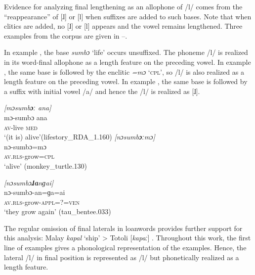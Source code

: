 Evidence for analyzing final lengthening as an allophone of /l/ comes from the ``reappearance'' of [ɺ] or [l] when suffixes are added to such bases. Note that when clitics are added, no [ɺ] or [l] appears and the vowel remains lengthened. Three examples from the corpus are given in --.\largerpage

In  example , the base \textit{sumbɔ{\ü}} `life' occurs unsuffixed. The phoneme /l/ is realized in its word-final allophone as a length feature on the preceding vowel. 
In  example , the same base is followed by the enclitic \textit{=mɔ} `\textsc{cpl}', so /l/ is also realized as a length feature on the preceding vowel.
In example  , the same base is followed by a suffix with initial vowel /a/ and hence the /l/ is realized as [ɺ]. 



\ea
\label{ex:mosumbo' ana}
\textit{[mɔsumb\textbf{ɔː} ana]}\\
\gll mɔ-sumbɔ{\ü} ana \\
\textsc{av-}live   \textsc{med} \\
\glt `(it is) alive'\hfill(lifestory\_RDA\_1.160)
\ex
\label{ex:nosumboomo}
\textit{[nɔsumb\textbf{ɔː}mɔ]}\\
\gll nɔ-sumbɔ{\ü}=mɔ \\
\textsc{av.rls-}grow\textsc{=cpl} \\
\glt `alive' \hfill (monkey\_turtle.130)

\newpage

\ex
\label{ex:mosumbolangai}
\textit{[nɔsumbɔ\textbf{ɺa}nɡai]}\\
\gll nɔ-sumbɔ{\ü}-an=ɡa=ai \\
\textsc{av.rls-}grow\textsc{-appl}\textsc{=?}\textsc{=ven} \\
\glt `they grow again' \hfill (tau\_bentee.033)
\z


The regular omission of final laterals in loanwords provides further support  for this analysis: Malay \textit{kapal} ‘ship’ > Totoli [\textit{kapaː}] .    
Throughout this work, the first line of examples gives a phonological representation of the examples. Hence, the lateral /l/ in final position is represented as /l/ but phonetically realized as a length feature.


